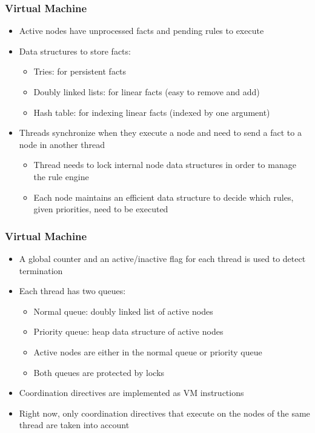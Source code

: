\documentclass{beamer}
\begin{document}
\begin{frame}[fragile]
   \frametitle{Virtual Machine}
   \begin{itemize}
      \item Active nodes have unprocessed facts and pending rules to execute
      \item Data structures to store facts:
      \begin{itemize}
         \item Tries: for persistent facts
         \item Doubly linked lists: for linear facts (easy to remove and add)
         \item Hash table: for indexing linear facts (indexed by one argument)
      \end{itemize}
      \item Threads synchronize when they execute a node and need to send a fact to a node in another thread
      \begin{itemize}
         \item Thread needs to lock internal node data structures in order to manage the rule engine
         \item Each node maintains an efficient data structure to decide which rules, given priorities, need to be executed 
      \end{itemize}
   \end{itemize}
\end{frame}

\begin{frame}[fragile]
   \frametitle{Virtual Machine}
   \begin{itemize}
      \item A global counter and an active/inactive flag for each thread is used to detect termination
      \item Each thread has two queues:
      \begin{itemize}
         \item Normal queue: doubly linked list of active nodes
         \item Priority queue: heap data structure of active nodes
         \item Active nodes are either in the normal queue or priority queue
         \item Both queues are protected by locks
      \end{itemize}
      \item Coordination directives are implemented as VM instructions
      \item Right now, only coordination directives that execute on the nodes of the same thread are taken into account
   \end{itemize}
\end{frame}
\end{document}
